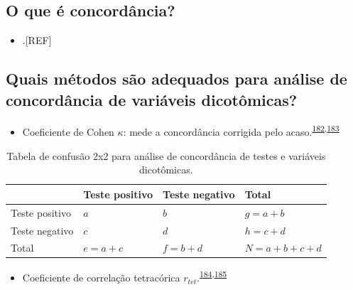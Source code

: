 \documentclass[
  a4paper,
]{book}
\providecommand{\tightlist}{%
  \setlength{\itemsep}{0pt}\setlength{\parskip}{0pt}}
\begin{document}
\hypertarget{o-que-uxe9-concorduxe2ncia}{%
\subsection{O que é concordância?}\label{o-que-uxe9-concorduxe2ncia}}

\begin{itemize}
\tightlist
\item
  .{[}REF{]}
\end{itemize}

\hypertarget{quais-muxe9todos-suxe3o-adequados-para-anuxe1lise-de-concorduxe2ncia-de-variuxe1veis-dicotuxf4micas}{%
\subsection{Quais métodos são adequados para análise de concordância de variáveis dicotômicas?}\label{quais-muxe9todos-suxe3o-adequados-para-anuxe1lise-de-concorduxe2ncia-de-variuxe1veis-dicotuxf4micas}}

\begin{itemize}
\tightlist
\item
  Coeficiente de Cohen \(\kappa\): mede a concordância corrigida pelo acaso.\textsuperscript{\protect\hyperlink{ref-scott1955}{182},\protect\hyperlink{ref-cohen1960}{183}}
\end{itemize}

\begin{table}

\caption{\label{tab:crosstable-kappa-2x2}Tabela de confusão 2x2 para análise de concordância de testes e variáveis dicotômicas.}
\centering
\begin{tabu} to 
\toprule
\textbf{ } & \textbf{Teste positivo} & \textbf{Teste negativo} & \textbf{Total}\\
\midrule
Teste positivo & $a$ & $b$ & $g=a+b$\\
Teste negativo & $c$ & $d$ & $h=c+d$\\
Total & $e=a+c$ & $f=b+d$ & $N=a+b+c+d$\\
\bottomrule
\end{tabu}
\end{table}

\begin{itemize}
\tightlist
\item
  Coeficiente de correlação tetracórica \(r_{tet}\).\textsuperscript{\protect\hyperlink{ref-i.mathe1901}{184},\protect\hyperlink{ref-banerjee1999}{185}}
\end{itemize}
\end{document}
